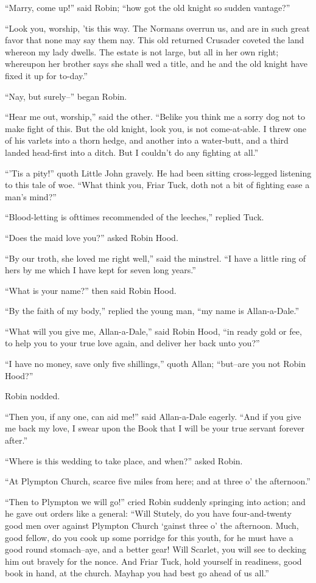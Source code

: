 ``Marry, come up!'' said Robin; ``how got the old knight so sudden
vantage?''

``Look you, worship, 'tis this way. The Normans overrun us, and are in
such great favor that none may say them nay. This old returned Crusader
coveted the land whereon my lady dwells. The estate is not large, but
all in her own right; whereupon her brother says she shall wed a title,
and he and the old knight have fixed it up for to-day.''

``Nay, but surely--'' began Robin.

``Hear me out, worship,'' said the other. ``Belike you think me a sorry
dog not to make fight of this. But the old knight, look you, is not
come-at-able. I threw one of his varlets into a thorn hedge, and another
into a water-butt, and a third landed head-first into a ditch. But I
couldn't do any fighting at all.''

``'Tis a pity!'' quoth Little John gravely. He had been sitting
cross-legged listening to this tale of woe. ``What think you, Friar
Tuck, doth not a bit of fighting ease a man's mind?''

``Blood-letting is ofttimes recommended of the leeches,'' replied Tuck.

``Does the maid love you?'' asked Robin Hood.

``By our troth, she loved me right well,'' said the minstrel. ``I have a
little ring of hers by me which I have kept for seven long years.''

``What is your name?'' then said Robin Hood.

``By the faith of my body,'' replied the young man, ``my name is
Allan-a-Dale.''

``What will you give me, Allan-a-Dale,'' said Robin Hood, ``in ready
gold or fee, to help you to your true love again, and deliver her back
unto you?''

``I have no money, save only five shillings,'' quoth Allan; ``but--are
you not Robin Hood?''

Robin nodded.

``Then you, if any one, can aid me!'' said Allan-a-Dale eagerly. ``And
if you give me back my love, I swear upon the Book that I will be your
true servant forever after.''

``Where is this wedding to take place, and when?'' asked Robin.

``At Plympton Church, scarce five miles from here; and at three o' the
afternoon.''

``Then to Plympton we will go!'' cried Robin suddenly springing into
action; and he gave out orders like a general: ``Will Stutely, do you
have four-and-twenty good men over against Plympton Church `gainst three
o' the afternoon. Much, good fellow, do you cook up some porridge for
this youth, for he must have a good round stomach--aye, and a better
gear! Will Scarlet, you will see to decking him out bravely for the
nonce. And Friar Tuck, hold yourself in readiness, good book in hand, at
the church. Mayhap you had best go ahead of us all.''


